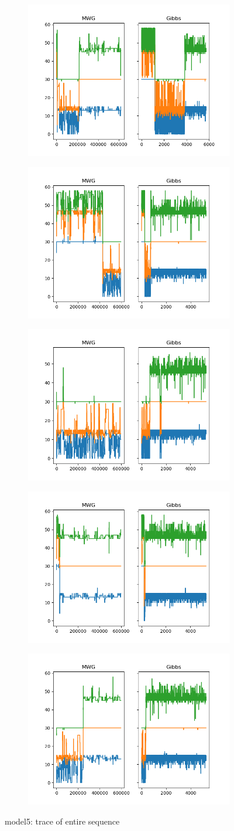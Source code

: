 \begin{figure}[H]
    \centering
    \begin{subfigure}
    	\centering
        \includegraphics[width=0.3\linewidth]{../../plots/Trace_M4_N60_NMCMC3_seed0_diffind2.png}
    \end{subfigure}
    \begin{subfigure}
        \centering
    	\includegraphics[width=0.3\linewidth]{../../plots/Trace_M4_N60_NMCMC3_seed1_diffind2.png}
	\end{subfigure}
	\begin{subfigure}
	    \centering
    	\includegraphics[width=0.3\linewidth]{../../plots/Trace_M4_N60_NMCMC3_seed2_diffind2.png}
	\end{subfigure}
	\begin{subfigure}
	    \centering
    	\includegraphics[width=0.3\linewidth]{../../plots/Trace_M4_N60_NMCMC3_seed3_diffind2.png}
	\end{subfigure}
	\begin{subfigure}
	    \centering
    	\includegraphics[width=0.3\linewidth]{../../plots/Trace_M4_N60_NMCMC3_seed4_diffind2.png}
	\end{subfigure}
	\caption{model5: trace of entire sequence}
\end{figure}

